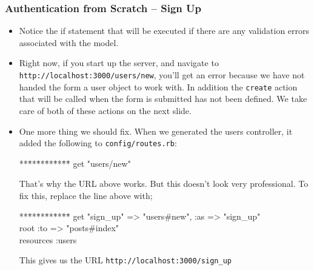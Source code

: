 \documentclass[t,handout]{beamer}
\begin{document}
\begin{frame}\frametitle{Authentication from Scratch -- Sign Up}
\vspace*{-0.1in}
{\small
 \begin{itemize}
  \item Notice the if statement that will be executed if there are any validation errors associated with the model.
  \pause
  \item Right now, if you start up the server, and navigate to {\tt http://localhost:3000/users/new}, you'll get an error because we have not handed the form a user object to work with.  \pause   In addition the {\tt create} action that will be called when the form is submitted has not been defined.  We take care of both of these actions on the next slide. \pause
  \item One more thing we should fix.  When we generated the users controller, it added the following to {\tt config/routes.rb}:
  {\tt\footnotesize \begin{tabbing} **\=**\=**\=**\=**\=**\= \kill
   \>  get "users/new"
   \end{tabbing}}
  That's why the URL above works. \pause But this doesn't look very professional. To fix this, replace the line above with;
    {\tt\footnotesize \begin{tabbing} **\=**\=**\=**\=**\=**\= \kill
  \>  get "sign\_up" => "users\#new", :as => "sign\_up" \\
  \> root :to => "posts\#index" \\
  \> resources :users
   \end{tabbing}}
   \pause
   This gives us the URL {\tt\footnotesize http://localhost:3000/sign\_up}
 \end{itemize}}
\end{frame}
\end{document}
